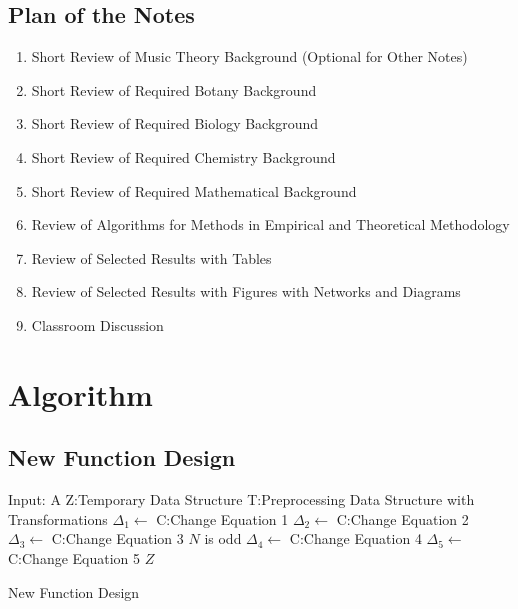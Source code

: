\documentclass[preprint, 9pt,times]{elsarticle}
\theoremstyle{definition}
\begin{document}
\vspace{4pt}

\subsection{Plan of the Notes}

\begin{enumerate}
\item Short Review of Music Theory Background (Optional for Other Notes)
\item Short Review of Required Botany Background
\item Short Review of Required Biology Background
\item Short Review of Required Chemistry Background
\item Short Review of Required Mathematical Background
\item Review of Algorithms for Methods in Empirical and Theoretical Methodology
\item Review of Selected Results with Tables
\item Review of Selected Results with Figures with Networks and Diagrams
\item Classroom Discussion
\end{enumerate}


\section{Algorithm}


\subsection{New Function Design}

\begin{algorithm}[H]
	\footnotesize
	\begin{algorithmic}[1]
		\State Input: A
		\State Z:Temporary Data Structure
		\State T:Preprocessing Data Structure with Transformations
		 \quad {}
		\State $\Delta_1 \leftarrow$ C:Change Equation 1
		\State $\Delta_2 \leftarrow$ C:Change Equation 2
		 \quad {}
		 \quad {}
		\State $\Delta_3 \leftarrow$ C:Change Equation 3
		\Else $N$ is odd \quad {}
		\State $\Delta_4 \leftarrow$ C:Change Equation 4
		\EndIf
		\EndWhile  \quad {}
		\EndFor
		\State $\Delta_5 \leftarrow$ C:Change Equation 5
		\Return $Z$
	\end{algorithmic}
	\caption{New Function Design}\label{Test_1}
\end{algorithm}
\end{document}
